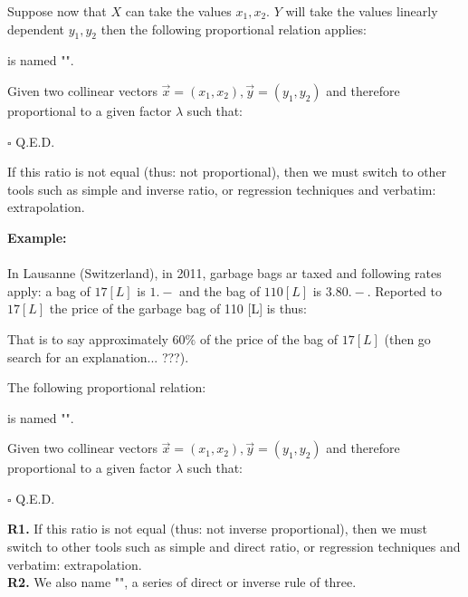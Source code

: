 \begin{theorem}
Suppose now that $X$ can take the values $x_1,x_2$. $Y$ will take  the values linearly dependent $y_1,y_2$ then the following proportional relation applies:
	
is named "".
\end{theorem}
\begin{dem}
	Given two collinear vectors $\vec{x}=(x_1,x_2),\vec{y}=(y_1,y_2)$ and therefore proportional to a given factor $\lambda$ such that:
	
	\begin{flushright}
		$\square$  Q.E.D.
	\end{flushright}
\end{dem}
	\begin{tcolorbox}[title=Remark,colframe=black,arc=10pt]
If this ratio is not equal (thus: not proportional), then we must switch to other tools such as simple and inverse ratio, or regression techniques and verbatim: extrapolation.
	\end{tcolorbox}	
	\begin{tcolorbox}[colframe=black,colback=white,sharp corners]
\textbf{{\Large {}}Example:}\\\\
In Lausanne (Switzerland), in 2011, garbage bags ar taxed and following rates apply: a bag of $17 [L]$ is $1.-$ and the bag of $110 [L]$ is $3.80.-$. Reported to $17 [L]$ the price of the garbage bag of 110 [L] is thus:
	
That is to say approximately $60\%$ of the price of the bag of $17 [L]$ (then go search for an explanation... ???).
	\end{tcolorbox}
\begin{theorem}
The following proportional relation:
	
is named "".
\end{theorem}
\begin{dem}
	Given two collinear vectors $\vec{x}=(x_1,x_2),\vec{y}=(y_1,y_2)$ and therefore proportional to a given factor $\lambda$ such that:
	
	\begin{flushright}
		$\square$  Q.E.D.
	\end{flushright}
\end{dem}
	\begin{tcolorbox}[title=Remark,colframe=black,arc=10pt]
\textbf{R1. }If this ratio is not equal (thus: not inverse proportional), then we must switch to other tools such as simple and direct ratio, or regression techniques and verbatim: extrapolation.\\
\textbf{R2.} We also name "", a series of direct or inverse rule of three.
	\end{tcolorbox}	

